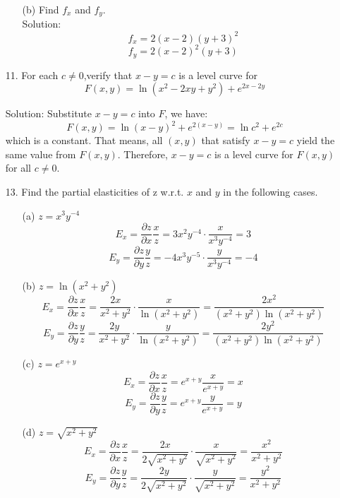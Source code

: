 \documentclass{article}
\begin{document}
\begin{enumerate}
\begin{enumerate}
            \item[(b)] Find $f_x$ and $f_y$. \\
            
            Solution:
            $$ f_x = 2(x-2)(y+3)^2 $$
            $$ f_y = 2(x-2)^2(y+3) $$

        \end{enumerate}
        
    \item[11. ] For each $c \neq 0$,verify that $x-y = c$ is a level curve for $$ F(x,y) = \ln{(x^2 - 2xy + y^2)} + e^{2x-2y} $$ 
    
    Solution: Substitute $x-y=c$ into $F$, we have:
    $$ F(x,y) = \ln{(x-y)^2} + e^{2(x-y)} = \ln{c^2} + e^{2c} $$
    which is a constant. That means, all $(x,y)$ that satisfy $x-y = c$ yield the same value from $F(x,y)$. Therefore, $x-y=c$ is a level curve for $F(x,y)$ for all $c \neq 0$.
    
    \item[13. ] Find the partial elasticities of z w.r.t. $x$ and $y$ in the following cases.
        \begin{enumerate}
            \item[(a)] $z = x^3y^{-4}$
            $$ E_x = \frac{\partial z}{\partial x}\frac{x}{z} = 3x^2y^{-4} \cdot \frac{x}{x^3y^{-4}} = 3 $$
            $$ E_y = \frac{\partial z}{\partial y}\frac{y}{z} = -4x^3y^{-5} \cdot \frac{y}{x^3y^{-4}} = -4 $$
            
            \item[(b)] $z =\ln{(x^2 + y^2)}$
            $$ E_x = \frac{\partial z}{\partial x}\frac{x}{z} = \frac{2x}{x^2+y^2} \cdot \frac{x}{\ln{(x^2+y^2)}} = \frac{2x^2}{(x^2+y^2)\ln{(x^2+y^2)}} $$
            $$ E_y = \frac{\partial z}{\partial y}\frac{y}{z} = \frac{2y}{x^2+y^2} \cdot \frac{y}{\ln{(x^2+y^2)}} = \frac{2y^2}{(x^2+y^2)\ln{(x^2+y^2)}} $$
            
            \item[(c)] $z = e^{x+y}$
            $$ E_x = \frac{\partial z}{\partial x}\frac{x}{z} = e^{x+y}\frac{x}{e^{x+y}} = x $$
            $$ E_y = \frac{\partial z}{\partial y}\frac{y}{z} = e^{x+y}\frac{y}{e^{x+y}} = y $$
            
            \item[(d)] $z = \sqrt{x^2 + y^2}$
            $$ E_x = \frac{\partial z}{\partial x}\frac{x}{z} = \frac{2x}{2\sqrt{x^2+y^2}} \cdot \frac{x}{\sqrt{x^2+y^2}} = \frac{x^2}{x^2+y^2} $$
            $$ E_y = \frac{\partial z}{\partial y}\frac{y}{z} = \frac{2y}{2\sqrt{x^2+y^2}} \cdot \frac{y}{\sqrt{x^2+y^2}} = \frac{y^2}{x^2+y^2} $$
            
        \end{enumerate}
        
\end{enumerate}
\end{document}
